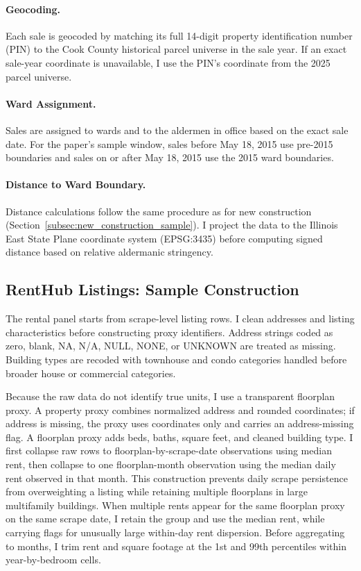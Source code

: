 \paragraph{Geocoding.}
Each sale is geocoded by matching its full 14-digit property identification number (PIN) to the Cook County historical parcel universe in the sale year.
If an exact sale-year coordinate is unavailable, I use the PIN's coordinate from the 2025 parcel universe.

\paragraph{Ward Assignment.}
Sales are assigned to wards and to the aldermen in office based on the exact sale date.
For the paper's sample window, sales before May 18, 2015 use pre-2015 boundaries and sales on or after May 18, 2015 use the 2015 ward boundaries.

\paragraph{Distance to Ward Boundary.}
Distance calculations follow the same procedure as for new construction (Section~\ref{subsec:new_construction_sample}).
I project the data to the Illinois East State Plane coordinate system (EPSG:3435) before computing signed distance based on relative aldermanic stringency.

\subsection{RentHub Listings: Sample Construction}
\label{subsec:renthub_sample}

The rental panel starts from scrape-level listing rows.
I clean addresses and listing characteristics before constructing proxy identifiers.
Address strings coded as zero, blank, NA, N/A, NULL, NONE, or UNKNOWN are treated as missing.
Building types are recoded with townhouse and condo categories handled before broader house or commercial categories.

Because the raw data do not identify true units, I use a transparent floorplan proxy.
A property proxy combines normalized address and rounded coordinates; if address is missing, the proxy uses coordinates only and carries an address-missing flag.
A floorplan proxy adds beds, baths, square feet, and cleaned building type.
I first collapse raw rows to floorplan-by-scrape-date observations using median rent, then collapse to one floorplan-month observation using the median daily rent observed in that month.
This construction prevents daily scrape persistence from overweighting a listing while retaining multiple floorplans in large multifamily buildings.
When multiple rents appear for the same floorplan proxy on the same scrape date, I retain the group and use the median rent, while carrying flags for unusually large within-day rent dispersion.
Before aggregating to months, I trim rent and square footage at the 1st and 99th percentiles within year-by-bedroom cells.

